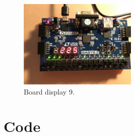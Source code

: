\documentclass[11pt]{article}
\newcommand{\Verilog}[2][]{%
	
}
\begin{document}
\begin{figure}[ht]\centering
	\includegraphics[width=0.5\textwidth]{board9}
	\caption{Board display 9.}
	\label{fig:board 9}			%
\end{figure}


\clearpage
\section*{Code}

\Verilog[firstline=23, lastline=53, caption=counter module source file,
label=code:counter]{counter.sv}

\Verilog[firstline=23, lastline=58, caption=sseg4 TDM module file,
label=code:mid-level]{sseg4_TDM.sv}

\Verilog[firstline=23, lastline=45, caption=calc lab10 module file,
label=code:top-level]{calc_lab10.sv}
\end{document}
